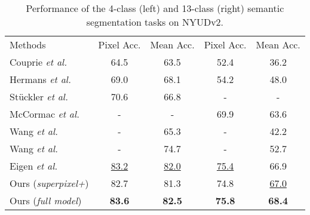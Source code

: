 \begin{table}[t!]
\scriptsize
  \begin{center}
    \caption{Performance of the 4-class (left) and 13-class (right) semantic segmentation tasks on NYUDv2. }
    \label{table:table_state_of_the_art_multiview}
    \begin{tabular}{lcccc}
      \toprule
       Methods & {Pixel Acc.} & {Mean Acc.} & {Pixel Acc.} & {Mean Acc.} \\
      \cmidrule(lr){1-1}\cmidrule(lr){2-3}\cmidrule(lr){4-5}
      Couprie \emph{et al.} \cite{couprie2013indoor}  & 64.5  & 63.5  &  52.4  & 36.2 \\
      Hermans \emph{et al.} \cite{hermans2014dense}     & 69.0  & 68.1 & 54.2 & 48.0 \\
      St{\"u}ckler \emph{et al.} \cite{stuckler2015dense}     & 70.6  & 66.8  & - & - \\
      McCormac \emph{et al.} \cite{SemanticFusion}      & -  & -   & 69.9 & 63.6 \\
      \cmidrule(lr){1-1}\cmidrule(lr){2-3}\cmidrule(lr){4-5}
      Wang \emph{et al.} \cite{Unsupervised_RGBD_segmentation}      & -  & 65.3   & - & 42.2 \\
      Wang \emph{et al.} \cite{specificfeature2016eccv}      & -  & 74.7   & - & 52.7 \\
      Eigen \emph{et al.} \cite{david2015multiscale}      & \underline{83.2}  & \underline{82.0}   & \underline{75.4} & 66.9 \\
      \cmidrule(lr){1-1}\cmidrule(lr){2-3}\cmidrule(lr){4-5}
      Ours (\textit{superpixel+}) & {82.7}  & {81.3}   & 74.8 & \underline{67.0} \\
      Ours (\textit{full model}) & \textbf{83.6}  & \textbf{82.5}   & \textbf{75.8} & \textbf{68.4} \\
      \bottomrule
    \end{tabular}
  \end{center}
\end{table}

\vspace{-0.1cm}
